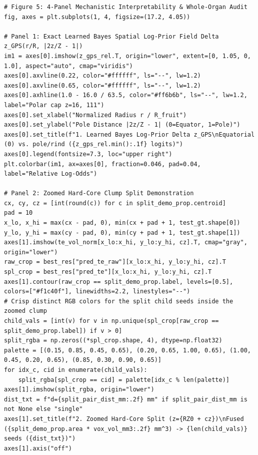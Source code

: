 \documentclass[10pt,a4paper]{article}
\begin{document}
\begin{codebox}
\begin{lstlisting}[style=pybmed]
# Figure 5: 4-Panel Mechanistic Interpretability & Whole-Organ Audit
fig, axes = plt.subplots(1, 4, figsize=(17.2, 4.05))

# Panel 1: Exact Learned Bayes Spatial Log-Prior Field Delta z_GPS(r/R, |2z/Z - 1|)
im1 = axes[0].imshow(z_gps_rel.T, origin="lower", extent=[0, 1.05, 0, 1.0], aspect="auto", cmap="viridis")
axes[0].axvline(0.22, color="#ffffff", ls="--", lw=1.2)
axes[0].axvline(0.65, color="#ffffff", ls="--", lw=1.2)
axes[0].axhline(1.0 - 16.0 / 63.5, color="#ff6b6b", ls="--", lw=1.2, label="Polar cap z=16, 111")
axes[0].set_xlabel("Normalized Radius r / R_fruit")
axes[0].set_ylabel("Pole Distance |2z/Z - 1| (0=Equator, 1=Pole)")
axes[0].set_title(f"1. Learned Bayes Log-Prior Delta z_GPS\nEquatorial (0) vs. pole/rind ({z_gps_rel.min():.1f} logits)")
axes[0].legend(fontsize=7.3, loc="upper right")
plt.colorbar(im1, ax=axes[0], fraction=0.046, pad=0.04, label="Relative Log-Odds")

# Panel 2: Zoomed Hard-Core Clump Split Demonstration
cx, cy, cz = [int(round(c)) for c in split_demo_prop.centroid]
pad = 10
x_lo, x_hi = max(cx - pad, 0), min(cx + pad + 1, test_gt.shape[0])
y_lo, y_hi = max(cy - pad, 0), min(cy + pad + 1, test_gt.shape[1])
axes[1].imshow(te_vol_norm[x_lo:x_hi, y_lo:y_hi, cz].T, cmap="gray", origin="lower")
raw_crop = best_res["pred_te_raw"][x_lo:x_hi, y_lo:y_hi, cz].T
spl_crop = best_res["pred_te"][x_lo:x_hi, y_lo:y_hi, cz].T
axes[1].contour(raw_crop == split_demo_prop.label, levels=[0.5], colors=["#f1c40f"], linewidths=2.2, linestyles="--")
# Crisp distinct RGB colors for the split child seeds inside the zoomed clump
child_vals = [int(v) for v in np.unique(spl_crop[raw_crop == split_demo_prop.label]) if v > 0]
split_rgba = np.zeros((*spl_crop.shape, 4), dtype=np.float32)
palette = [(0.15, 0.85, 0.45, 0.65), (0.20, 0.65, 1.00, 0.65), (1.00, 0.45, 0.20, 0.65), (0.85, 0.30, 0.90, 0.65)]
for idx_c, cid in enumerate(child_vals):
    split_rgba[spl_crop == cid] = palette[idx_c % len(palette)]
axes[1].imshow(split_rgba, origin="lower")
dist_txt = f"d={split_pair_dist_mm:.2f} mm" if split_pair_dist_mm is not None else "single"
axes[1].set_title(f"2. Zoomed Hard-Core Split (z={RZ0 + cz})\nFused ({split_demo_prop.area * vox_vol_mm3:.2f} mm^3) -> {len(child_vals)} seeds ({dist_txt})")
axes[1].axis("off")


\end{lstlisting}
\end{codebox}
\end{document}
